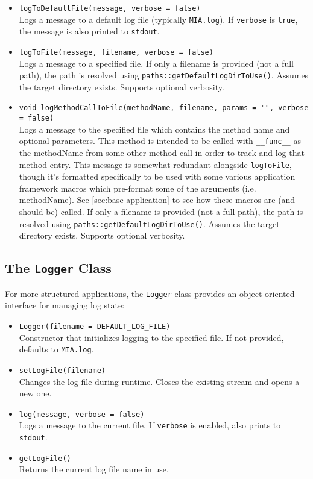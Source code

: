 \begin{itemize}
	\item \texttt{logToDefaultFile(message, verbose = false)}\\
	Logs a message to a default log file (typically \texttt{MIA.log}). If \texttt{verbose} is \texttt{true}, the message is also printed to \texttt{stdout}.
	
	\item \texttt{logToFile(message, filename, verbose = false)}\\
	Logs a message to a specified file. If only a filename is provided (not a full path), the path is resolved using \texttt{paths::getDefaultLogDirToUse()}. Assumes the target directory exists. Supports optional verbosity.

 	\item \texttt{void logMethodCallToFile(methodName, filename, params = "", verbose = false)}\\
  	Logs a message to the specified file which contains the method name and optional parameters. This method is intended to be called with \texttt{\_\_func\_\_} as the methodName from some other method call in order to track and log that method entry. This message is somewhat redundant alongside \texttt{logToFile}, though it's formatted specifically to be used with some various application framework macros which pre-format some of the arguments (i.e. methodName). See \ref{sec:base-application} to see how these macros are (and should be) called. If only a filename is provided (not a full path), the path is resolved using \texttt{paths::getDefaultLogDirToUse()}. Assumes the target directory exists. Supports optional verbosity.
\end{itemize}

\subsection{The \texttt{Logger} Class}
For more structured applications, the \texttt{Logger} class provides an object-oriented interface for managing log state:

\begin{itemize}
	\item \texttt{Logger(filename = DEFAULT\_LOG\_FILE)}\\
	Constructor that initializes logging to the specified file. If not provided, defaults to \texttt{MIA.log}.
	
	\item \texttt{setLogFile(filename)}\\
	Changes the log file during runtime. Closes the existing stream and opens a new one.
	
	\item \texttt{log(message, verbose = false)}\\
	Logs a message to the current file. If \texttt{verbose} is enabled, also prints to \texttt{stdout}.
	
	\item \texttt{getLogFile()}\\
	Returns the current log file name in use.
\end{itemize}

